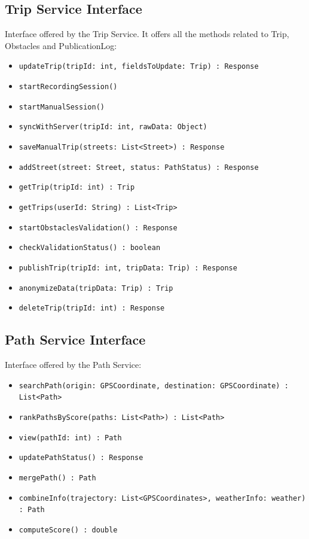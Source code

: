 \subsection{Trip Service Interface}
Interface offered by the Trip Service. It offers all the methods related to Trip, Obstacles and PublicationLog:
\begin{itemize}
    \item \texttt{updateTrip(tripId: int, fieldsToUpdate: Trip) : Response}
    \item \texttt{startRecordingSession()}
    \item \texttt{startManualSession()}
    \item \texttt{syncWithServer(tripId: int, rawData: Object)}
    \item \texttt{saveManualTrip(streets: List<Street>) : Response}
    \item \texttt{addStreet(street: Street, status: PathStatus) : Response}
    \item \texttt{getTrip(tripId: int) : Trip}
    \item \texttt{getTrips(userId: String) : List<Trip>}
    \item \texttt{startObstaclesValidation() : Response}
    \item \texttt{checkValidationStatus() : boolean}
    \item \texttt{publishTrip(tripId: int, tripData: Trip) : Response}
    \item \texttt{anonymizeData(tripData: Trip) : Trip}
    \item \texttt{deleteTrip(tripId: int) : Response}
\end{itemize}

\subsection{Path Service Interface}
Interface offered by the Path Service:
\begin{itemize}
    \item \texttt{searchPath(origin: GPSCoordinate, destination: GPSCoordinate) : List<Path>}
    \item \texttt{rankPathsByScore(paths: List<Path>) : List<Path>}
    \item \texttt{view(pathId: int) : Path}
    \item \texttt{updatePathStatus() : Response}
    \item \texttt{mergePath() : Path}
    \item \texttt{combineInfo(trajectory: List<GPSCoordinates>, weatherInfo: weather) : Path}
    \item \texttt{computeScore() : double}
\end{itemize}

